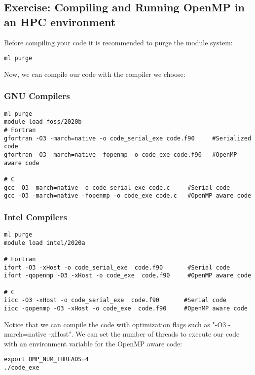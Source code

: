 \subsection{Exercise: Compiling and Running OpenMP in an HPC environment }

Before compiling your code it is recommended to purge the module system:

\begin{verbatim}
ml purge
\end{verbatim}

Now, we can compile our code with the compiler we choose:

\subsubsection{GNU Compilers}

\begin{verbatim}
ml purge
module load foss/2020b
# Fortran
gfortran -O3 -march=native -o code_serial_exe code.f90     #Serialized code
gfortran -O3 -march=native -fopenmp -o code_exe code.f90   #OpenMP aware code

# C
gcc -O3 -march=native -o code_serial_exe code.c     #Serial code
gcc -O3 -march=native -fopenmp -o code_exe code.c   #OpenMP aware code
\end{verbatim}

\subsubsection{Intel Compilers}

\begin{verbatim}
ml purge
module load intel/2020a

# Fortran
ifort -O3 -xHost -o code_serial_exe  code.f90       #Serial code
ifort -qopenmp -O3 -xHost -o code_exe  code.f90     #OpenMP aware code

# C
iicc -O3 -xHost -o code_serial_exe  code.f90       #Serial code
iicc -qopenmp -O3 -xHost -o code_exe  code.f90     #OpenMP aware code
\end{verbatim}

Notice that we can compile the code with optimization flags such as "-O3 -march=native -xHost". 
We can set the number of threads to  execute our code with an environment variable
for the OpenMP aware code:

\begin{verbatim}
export OMP_NUM_THREADS=4
./code_exe
\end{verbatim}

